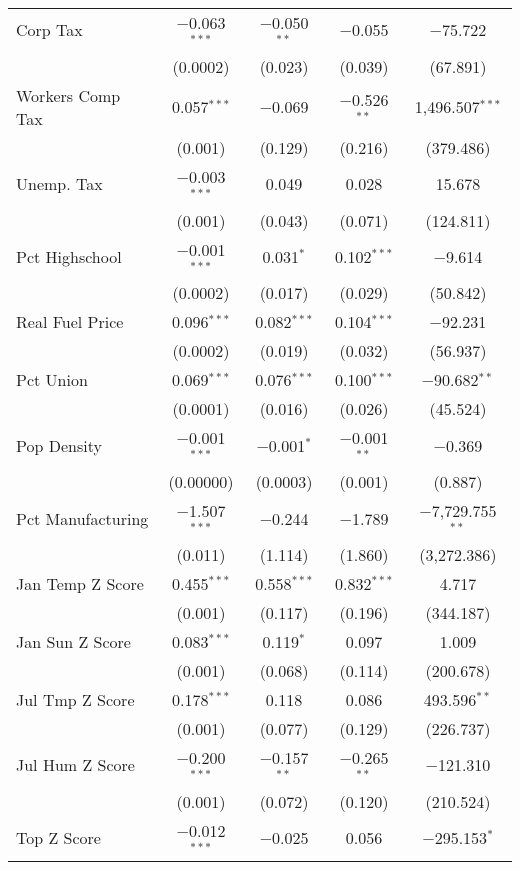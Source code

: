 \begin{table}[!htbp]
\begin{tabular}{@{\extracolsep{5pt}}lcccc}
  Corp Tax & $-$0.063$^{***}$ & $-$0.050$^{**}$ & $-$0.055 & $-$75.722 \\ 
  & (0.0002) & (0.023) & (0.039) & (67.891) \\ 
  Workers Comp Tax & 0.057$^{***}$ & $-$0.069 & $-$0.526$^{**}$ & 1,496.507$^{***}$ \\ 
  & (0.001) & (0.129) & (0.216) & (379.486) \\ 
  Unemp. Tax & $-$0.003$^{***}$ & 0.049 & 0.028 & 15.678 \\ 
  & (0.001) & (0.043) & (0.071) & (124.811) \\ 
  Pct Highschool & $-$0.001$^{***}$ & 0.031$^{*}$ & 0.102$^{***}$ & $-$9.614 \\ 
  & (0.0002) & (0.017) & (0.029) & (50.842) \\ 
  Real Fuel Price & 0.096$^{***}$ & 0.082$^{***}$ & 0.104$^{***}$ & $-$92.231 \\ 
  & (0.0002) & (0.019) & (0.032) & (56.937) \\ 
  Pct Union & 0.069$^{***}$ & 0.076$^{***}$ & 0.100$^{***}$ & $-$90.682$^{**}$ \\ 
  & (0.0001) & (0.016) & (0.026) & (45.524) \\ 
  Pop Density & $-$0.001$^{***}$ & $-$0.001$^{*}$ & $-$0.001$^{**}$ & $-$0.369 \\ 
  & (0.00000) & (0.0003) & (0.001) & (0.887) \\ 
  Pct Manufacturing & $-$1.507$^{***}$ & $-$0.244 & $-$1.789 & $-$7,729.755$^{**}$ \\ 
  & (0.011) & (1.114) & (1.860) & (3,272.386) \\ 
  Jan Temp Z Score & 0.455$^{***}$ & 0.558$^{***}$ & 0.832$^{***}$ & 4.717 \\ 
  & (0.001) & (0.117) & (0.196) & (344.187) \\ 
  Jan Sun Z Score & 0.083$^{***}$ & 0.119$^{*}$ & 0.097 & 1.009 \\ 
  & (0.001) & (0.068) & (0.114) & (200.678) \\ 
  Jul Tmp Z Score & 0.178$^{***}$ & 0.118 & 0.086 & 493.596$^{**}$ \\ 
  & (0.001) & (0.077) & (0.129) & (226.737) \\ 
  Jul Hum Z Score & $-$0.200$^{***}$ & $-$0.157$^{**}$ & $-$0.265$^{**}$ & $-$121.310 \\ 
  & (0.001) & (0.072) & (0.120) & (210.524) \\ 
  Top Z Score & $-$0.012$^{***}$ & $-$0.025 & 0.056 & $-$295.153$^{*}$ \\ 

\end{tabular}
\end{table}
